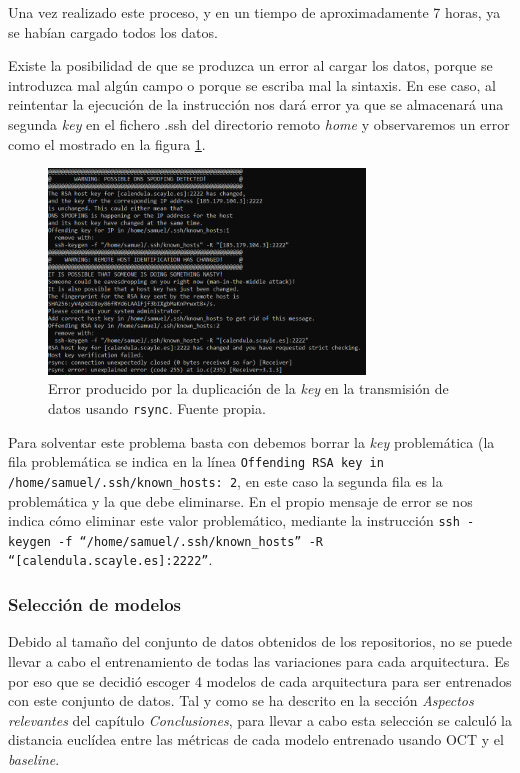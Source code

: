 Una vez realizado este proceso, y en un tiempo de aproximadamente 7 horas, ya se habían cargado todos los datos.

Existe la posibilidad de que se produzca un error al cargar los datos, porque se introduzca mal algún campo o porque se escriba mal la sintaxis. En ese caso, al reintentar la ejecución de la instrucción nos dará error ya que se almacenará una segunda \textit{key} en el fichero .ssh del directorio remoto \textit{home} y observaremos un error como el mostrado en la figura \ref{fig:error_scayle}.

\begin{figure}[h]
    \centering
    \includegraphics[width=0.75\textwidth]{img/error_scayle.png}
    \caption{Error producido por la duplicación de la \textit{key} en la transmisión de datos usando \texttt{rsync}. Fuente propia.}
    \label{fig:error_scayle}
\end{figure}

Para solventar este problema basta con debemos borrar la \textit{key} problemática (la fila problemática se indica en la línea \texttt{Offending RSA  key in /home/samuel/.ssh/known\_hosts: 2}, en este caso la segunda fila es la problemática y la que debe eliminarse. En el propio mensaje de error se nos indica cómo eliminar este valor problemático, mediante la instrucción \texttt{ssh -keygen -f ``/home/samuel/.ssh/known\_hosts'' -R ``[calendula.scayle.es]:2222''}.

\subsubsection{Selección de modelos}

Debido al tamaño del conjunto de datos obtenidos de los repositorios, no se puede llevar a cabo el entrenamiento de todas las variaciones para cada arquitectura. Es por eso que se decidió escoger 4 modelos de cada arquitectura para ser entrenados con este conjunto de datos. Tal y como se ha descrito en la sección \textit{Aspectos relevantes} del capítulo \textit{Conclusiones}, para llevar a cabo esta selección se calculó la distancia euclídea entre las métricas de cada modelo entrenado usando OCT y el \textit{baseline}.

